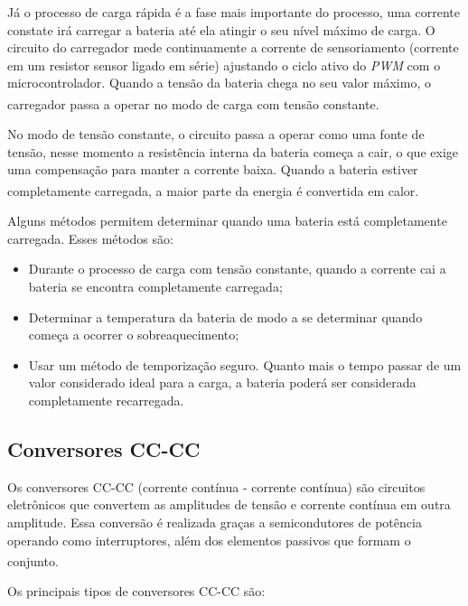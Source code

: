 \documentclass[
	12pt,				%
	openright,			%
	oneside,			%
	a4paper,			%
	english,			%
	french,				%
	spanish,			%
	brazil,				%
	oldfontcommands
	]{abntex2}
\begin{document}
	Já o processo de carga rápida é a fase mais importante do processo, uma corrente constate irá carregar a bateria até ela atingir o seu nível máximo de carga. O circuito do carregador mede continuamente a corrente de sensoriamento (corrente em um resistor sensor ligado em série) ajustando o ciclo ativo do \textit{PWM} com o microcontrolador. Quando a tensão da bateria chega no seu valor máximo, o carregador passa a operar no modo de carga com tensão constante.\textsuperscript{\cite{carregador}}
	
	No modo de tensão constante, o circuito passa a operar como uma fonte de tensão, nesse momento a resistência interna da bateria começa a cair, o que exige uma compensação para manter a corrente baixa. Quando a bateria estiver completamente carregada, a maior parte da energia é convertida em calor.\textsuperscript{\cite{carregador}}

	Alguns métodos permitem determinar quando uma bateria está completamente carregada. Esses métodos são:
	
	\begin{itemize}
		\item Durante o processo de carga com tensão constante, quando a corrente cai a bateria se encontra completamente carregada;
		\item Determinar a temperatura da bateria de modo a se determinar quando começa a ocorrer o sobreaquecimento;
		\item Usar um método de temporização seguro. Quanto mais o tempo passar de um valor considerado ideal para a carga, a bateria poderá ser considerada completamente recarregada.
	\end{itemize}

\subsection[Conversores CC-CC]{Conversores CC-CC}

	Os conversores CC-CC (corrente contínua - corrente contínua) são circuitos eletrônicos que convertem as amplitudes de tensão e corrente contínua em outra amplitude. Essa conversão é realizada graças a semicondutores de potência operando como interruptores, além dos elementos passivos que formam o conjunto.\textsuperscript{\cite{semicondutores3}}
	
	Os principais tipos de conversores CC-CC são:
	
\end{document}
